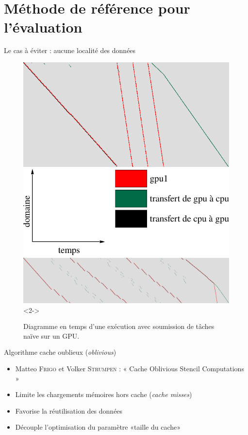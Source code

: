 \documentclass[9pt]{beamer}
\begin{document}
\section{Méthode de référence pour l'évaluation}

\begin{frame}{\textcolor{inriaGrey}{Le cas à éviter : aucune localité des données}}
  \begin{figure}
    \centering
    \hspace*{\fill}
    \includegraphics[width=0.45\linewidth]{img/worst-nolimit.png}
    \hspace*{\fill}
    \includegraphics[width=0.55\linewidth]{img/xpm-legend-gpu1.pdf}
    \hspace*{\fill}
    \newline \vfill
    \includegraphics[width=1\linewidth]{img/worst-limit.png}<2->
    \vfill
    \caption{Diagramme en temps d'une exécution avec soumission de tâches naïve
      sur un GPU.}
  \end{figure}
\end{frame}

\begin{frame}{\textcolor{inriaGrey}{Algorithme cache oublieux (\textit{oblivious})}}
  \vfill
  \begin{itemize}
  \item Matteo \textsc{Frigo} et Volker \textsc{Strumpen} : « Cache Oblivious
    Stencil Computations » \vfill
  \item<2-> Limite les chargements mémoires hors cache (\textit{cache misses})
    \vfill
  \item<3-> Favorise la réutilisation des données \vfill
  \item<4-> Découple l'optimisation du paramètre «taille du cache»
  \end{itemize}
  \vfill
\end{frame}
\end{document}
